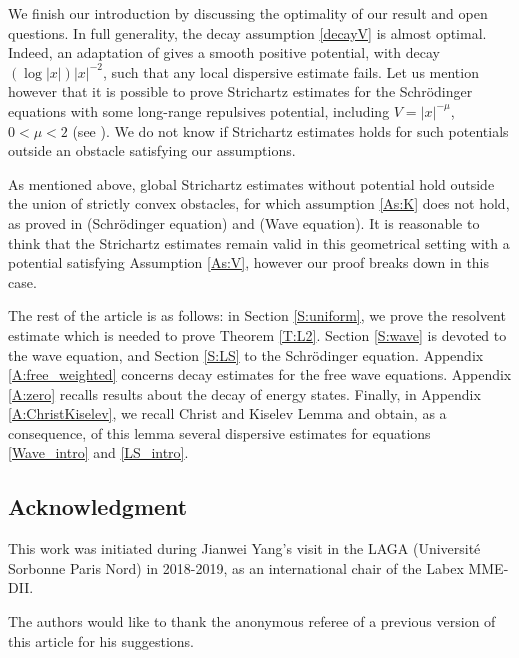 \documentclass[10pt,leqno]{amsart}
\theoremstyle{definition}%
\theoremstyle{remark}
\numberwithin{equation}{section}
\renewcommand{\^}{\widehat}%
\begin{document}
We finish our introduction by discussing the optimality of our result and open questions. In full generality, the decay assumption \eqref{decayV} is almost optimal. Indeed, an adaptation of \cite{Duyckaerts07a} gives a smooth positive potential, with decay $(\log |x|)|x|^{-2}$, such that any local dispersive estimate fails. Let us mention however that it is possible to prove Strichartz estimates for the Schr\"odinger equations with some long-range repulsives potential, including $V=|x|^{-\mu}$, $0<\mu<2$ (see \cite{Mizutani20}). We do not know if Strichartz estimates holds for such potentials outside an obstacle satisfying our assumptions. 

As mentioned above, global Strichartz estimates without potential hold outside the union of strictly convex obstacles, for which assumption \ref{As:K} does not hold, as proved in \cite{Lafontaine18P} (Schr\"o\-din\-ger equation) and \cite{Lafontaine22} (Wave equation). It is reasonable to think that the Strichartz estimates remain valid in this geometrical setting with a potential satisfying Assumption \ref{As:V},  however our proof breaks down in this case.

The rest of the article is as follows: in Section \ref{S:uniform}, we prove the resolvent estimate which is needed to prove Theorem \ref{T:L2}. Section \ref{S:wave} is devoted to the wave equation, and Section \ref{S:LS} to the Schr\"odinger equation. Appendix \ref{A:free_weighted} concerns decay estimates for the free wave equations. Appendix \ref{A:zero} recalls results about the decay of energy states. Finally, in Appendix  \ref{A:ChristKiselev}, we recall Christ and Kiselev Lemma and obtain, as a consequence, of this lemma several dispersive estimates for equations \eqref{Wave_intro} and \eqref{LS_intro}.

\subsection*{Acknowledgment}
This work was initiated during Jianwei Yang's visit in the LAGA (Universit\'e Sorbonne Paris Nord) in 2018-2019, as an international chair of the Labex MME-DII.

The authors would like to thank the anonymous referee of a previous version of this article for his suggestions.
\end{document}
